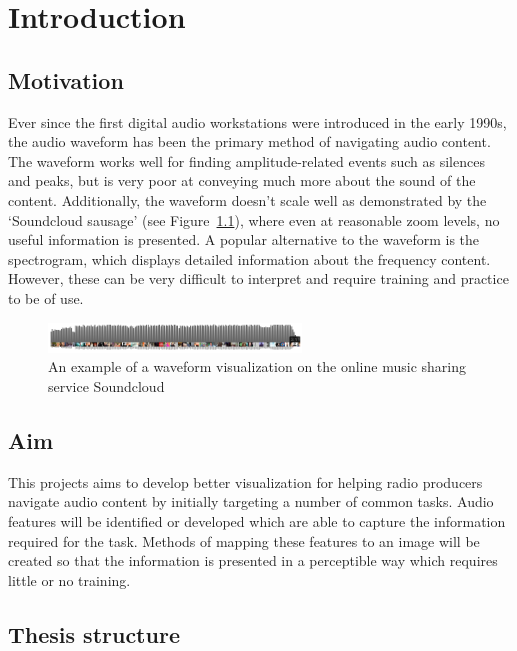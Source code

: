 \chapter{Introduction}\label{chpt:intro}

\section{Motivation}\label{sec:intro/motivation}
Ever since the first digital audio workstations were introduced in the early
1990s, the audio waveform has been the primary method of navigating audio
content. The waveform works well for finding amplitude-related events such as
silences and peaks, but is very poor at conveying much more about the sound of
the content. Additionally, the waveform doesn't scale well as demonstrated by
the `Soundcloud sausage' (see Figure~\ref{fig:soundcloud}), where even at
reasonable zoom levels, no useful information is presented.  A popular
alternative to the waveform is the spectrogram, which displays detailed
information about the frequency content. However, these can be very difficult
to interpret and require training and practice to be of use.

\begin{figure}[ht]
  \centering
  \includegraphics[width=0.6\textwidth]{figs/soundcloud.png}
  \caption{An example of a waveform visualization on the online music sharing
    service Soundcloud}
  \label{fig:soundcloud}
\end{figure}

\section{Aim}\label{sec:intro/aim}
This projects aims to develop better visualization for helping radio producers
navigate audio content by initially targeting a number of common tasks. Audio
features will be identified or developed which are able to capture the
information required for the task. Methods of mapping these features to an
image will be created so that the information is presented in a perceptible way
which requires little or no training. 

\section{Thesis structure}\label{sec:intro/structure}

